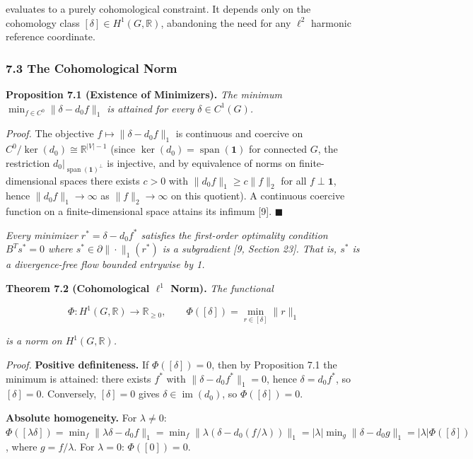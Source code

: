 \documentclass[
]{article}
\begin{document}
evaluates to a purely cohomological constraint. It depends only on the
cohomology class \([\delta] \in H^1(G, \mathbb{R})\), abandoning the
need for any \(\ell^2\) harmonic reference coordinate.

\subsubsection{7.3 The Cohomological Norm}\label{the-cohomological-norm}

\textbf{Proposition 7.1 (Existence of Minimizers).} \emph{The minimum
\(\min_{f \in C^0} \|\delta - d_0 f\|_1\) is attained for every
\(\delta \in C^1(G)\).}

\emph{Proof.} The objective \(f \mapsto \|\delta - d_0 f\|_1\) is
continuous and coercive on \(C^0 / \ker(d_0) \cong \mathbb{R}^{|V|-1}\)
(since \(\ker(d_0) = \operatorname{span}(\mathbf{1})\) for connected
\(G\), the restriction \(d_0|_{\operatorname{span}(\mathbf{1})^\perp}\)
is injective, and by equivalence of norms on finite-dimensional spaces
there exists \(c > 0\) with \(\|d_0 f\|_1 \geq c\|f\|_2\) for all
\(f \perp \mathbf{1}\), hence \(\|d_0 f\|_1 \to \infty\) as
\(\|f\|_2 \to \infty\) on this quotient). A continuous coercive function
on a finite-dimensional space attains its infimum {[}9{]}.
\(\blacksquare\)

\emph{Every minimizer \(r^* = \delta - d_0 f^*\) satisfies the
first-order optimality condition \(B^T s^* = 0\) where
\(s^* \in \partial\|\cdot\|_1(r^*)\) is a subgradient {[}9, Section
23{]}. That is, \(s^*\) is a divergence-free flow bounded entrywise by
1.}

\textbf{Theorem 7.2 (Cohomological \(\ell^1\) Norm).} \emph{The
functional}

\[ \Phi : H^1(G, \mathbb{R}) \to \mathbb{R}_{\geq 0}, \qquad \Phi([\delta]) = \min_{r \in [\delta]} \|r\|_1 \]

\emph{is a norm on \(H^1(G, \mathbb{R})\).}

\emph{Proof.} \textbf{Positive definiteness.} If \(\Phi([\delta]) = 0\),
then by Proposition 7.1 the minimum is attained: there exists \(f^*\)
with \(\|\delta - d_0 f^*\|_1 = 0\), hence \(\delta = d_0 f^*\), so
\([\delta] = 0\). Conversely, \([\delta] = 0\) gives
\(\delta \in \operatorname{im}(d_0)\), so \(\Phi([\delta]) = 0\).

\textbf{Absolute homogeneity.} For \(\lambda \neq 0\):
\(\Phi([\lambda \delta]) = \min_f \|\lambda \delta - d_0 f\|_1 = \min_f \|\lambda(\delta - d_0(f/\lambda))\|_1 = |\lambda| \min_g \|\delta - d_0 g\|_1 = |\lambda| \Phi([\delta])\),
where \(g = f/\lambda\). For \(\lambda = 0\): \(\Phi([0]) = 0\).
\end{document}
